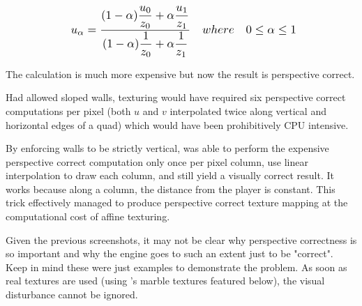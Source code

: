 \begin{equation*}
    \scalebox{1.2}{
$u_{\alpha} = \dfrac{
                      (1 - \alpha)\dfrac{u_{0}} {z_{0}} +    \alpha\dfrac{u_{1}} {z_{1}}  
                    }       
                    {  
                      (1 - \alpha)\dfrac{1} {z_{0}} + \alpha\dfrac{1} {z_{1}}    
                    }   \quad{where}\quad0\leq \alpha \leq 1 $\\
}
\end{equation*}
\par
\vspace{4pt}
The calculation is much more expensive but now the result is perspective correct.\\
\par
{}
Had \doom{} allowed sloped walls, texturing would have required six perspective correct computations per pixel (both $u$ and $v$ interpolated twice along vertical and horizontal edges of a quad) which would have been prohibitively CPU intensive.\\
\par
 By enforcing walls to be strictly vertical, \doom{} was able to perform the expensive perspective correct computation only once per pixel column, use linear interpolation to draw each column, and still yield a visually correct result. It works because along a column, the distance from the player is constant. This trick effectively managed to produce perspective correct texture mapping at the computational cost of affine texturing.\\
\par
Given the previous screenshots, it may not be clear why perspective correctness is so important and why the engine goes to such an extent just to be "correct". Keep in mind these were just examples to demonstrate the problem. As soon as real textures are used (using \doom{}'s marble textures featured below), the visual disturbance cannot be ignored.\\
\par
\par
\begin{minipage}{0.32\textwidth}
\end{minipage}
\hspace{1mm}
\begin{minipage}{0.32\textwidth}
\end{minipage}
\hspace{1mm}
\begin{minipage}{0.32\textwidth}
\end{minipage}
\par

